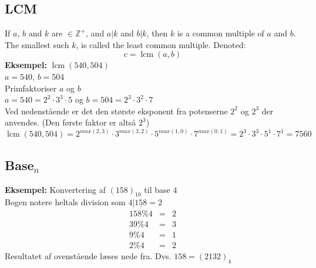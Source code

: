 \documentclass[a4paper]{article}
\newcommand{\Integers}{\mathbb{Z}}
\begin{document}
  \subsection{LCM}
   If $a$, $b$ and $k$ are $\in \Integers^+$, and $a | k$ and $b | k$, then $k$ is a common multiple of $a$ and $b$. The smallest such $k$, is called the least common multiple. Denoted:
    $$c = \operatorname{lcm}(a, b)$$
    \textbf{Eksempel:} $\operatorname{lcm}(540, 504)$\\
    $a = 540$, $b = 504$\\
    Primfaktoriser $a$ og $b$\\
    $a = 540 = 2^2 \cdot 3^3 \cdot 5$ og $b = 504 = 2^3 \cdot 3^2 \cdot 7$\\
    Ved nedenstående er det den største eksponent fra potenserne $2^2$ og $2^3$ der anvendes. (Den første faktor er altså $2^3$)\\
    $\operatorname{lcm}(540, 504) = 2^{max(2, 3)} \cdot 3^{max(3, 2)} \cdot 5^{max(1, 0)} \cdot 7^{max(0, 1)} = 2^3 \cdot 3^3 \cdot 5^1 \cdot 7^1 = 7560$


  \subsection{Base$_n$}
   
   \textbf{Eksempel:} Konvertering af $(158)_{10}$ til base $4$\\
   Bogen notere heltals division som $4|\underline{158} = 2$\\
   \begin{eqnarray}
    158 \% 4 &=& 2 \nonumber\\
    39 \% 4 &=& 3 \nonumber\\
    9 \% 4 &=& 1 \nonumber\\
    2 \% 4 &=& 2 \nonumber
   \end{eqnarray}
   Resultatet af ovenstående læses nede fra. Dvs. $158 = (2132)_4$
\end{document}
